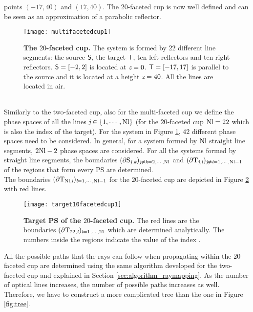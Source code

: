 points $(-17,40)$ and $(17,40)$. The $20$-faceted cup is now well defined and can be seen as an approximation of a parabolic reflector.
\begin{figure}[h]
\centering
\label{fig:multifacetedcup}
\texttt{[image: multifacetedcup1]}
\caption{\textbf{The $20$-faceted cup.} The system is formed by $22$ different line segments: the source $\textsf{S}$, the target
$\textsf{T}$, ten left reflectors and ten right reflectors.
 $\textsf{S}=[-2,2]$ is located at $\textit{z}=0$. $\textsf{T} = [-17,17]$ is parallel to the source and it is located at a height $\textit{z}=40$.
 All the lines are located in air.}
\label{fig:multifacetedcup}
\end{figure}
\\ \indent
Similarly to the two-faceted cup, also for the multi-faceted cup we define the phase spaces of all the lines $\textit{j}\in\{1, \cdots, \textrm{Nl}\}$ (for the $20$-faceted cup $\textrm{Nl}=22$ which is also the index of the target). 
For the system in Figure \ref{fig:multifacetedcup}, $42$ different phase spaces need to be considered.
In general, for a system formed by $\textrm{Nl}$ straight line segments, $2\textrm{Nl}-2$ phase spaces are considered.
For all the systems formed by straight line segments, the boundaries $(\partial\mbox{$\textup{S}_{\textit{\textit{j},\textit{k}}}$})_{\textit{j}\neq\textit{k}=2, \cdots, \textrm{Nl}}$ and $(\partial\mbox{$\textup{T}_{\textit{\textit{j},\textit{l}}}$})_{\textit{j}\neq\textit{l}=1, \cdots, \textrm{Nl}-1}$ of the regions that form every PS are determined. \\
\indent The boundaries $(\partial\mbox{$\textup{T}$}_{\textrm{Nl},\textit{l}})_{\textit{l}=1, \cdots, \textrm{Nl}-1}$ for the $20$-faceted cup are depicted in Figure \ref{fig:T20} with red lines.
\begin{figure}[h]
\centering
\label{fig:T20}
\texttt{[image: target10facetedcup1]}
\caption{\textbf{Target PS of the $20$-faceted cup.}
The red lines are the boundaries $(\partial\mbox{$\textup{T}_{\textit{$22$,\textit{l}}}$})_{\textit{l}=1, \cdots, 21}$ which are determined analytically. The numbers inside the regions  indicate the value of the index \lineak.}
\label{fig:T20}
\end{figure}
All the possible paths that the rays can follow when propagating within the $20$-faceted cup are determined using the same algorithm developed for the two-faceted cup and explained in Section \ref{sec:algorithm_raymapping}.
 As the number of optical lines increases, the number of possible paths increases as well.
 Therefore, we have to construct a more complicated tree than the one in Figure \ref{fig:tree}.
